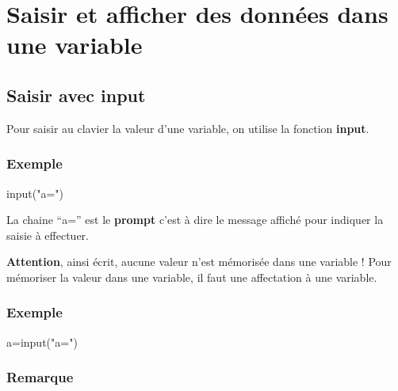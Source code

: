 \documentclass[11pt]{article}
\newenvironment{Shaded}{}{}
\newcommand{\StringTok}[1]{\textcolor[rgb]{0.25,0.44,0.63}{{#1}}}
\newcommand{\NormalTok}[1]{{#1}}
\newcommand{\OperatorTok}[1]{\textcolor[rgb]{0.40,0.40,0.40}{{#1}}}
\newcommand{\BuiltInTok}[1]{{#1}}
\begin{document}
    \hypertarget{saisir-et-afficher-des-donnuxe9es-dans-une-variable}{%
\section{Saisir et afficher des données dans une
variable}\label{saisir-et-afficher-des-donnuxe9es-dans-une-variable}}

\hypertarget{saisir-avec-input}{%
\subsection{Saisir avec input}\label{saisir-avec-input}}

Pour saisir au clavier la valeur d'une variable, on utilise la fonction
\textbf{input}.

\hypertarget{exemple}{%
\subsubsection*{Exemple}\label{exemple}}

\begin{Shaded}
\begin{Highlighting}[]
\BuiltInTok{input}\NormalTok{(}\StringTok{"a="}\NormalTok{)}
\end{Highlighting}
\end{Shaded}

La chaine ``a='' est le \textbf{prompt} c'est à dire le message affiché
pour indiquer la saisie à effectuer.

\textbf{Attention}, ainsi écrit, aucune valeur n'est mémorisée dans une
variable ! Pour mémoriser la valeur dans une variable, il faut une
affectation à une variable.

\hypertarget{exemple-1}{%
\subsubsection*{Exemple}\label{exemple-1}}

\begin{Shaded}
\begin{Highlighting}[]
\NormalTok{a}\OperatorTok{=}\BuiltInTok{input}\NormalTok{(}\StringTok{"a="}\NormalTok{)}
\end{Highlighting}
\end{Shaded}

\hypertarget{remarque}{%
\subsubsection*{Remarque}\label{remarque}}
\end{document}
